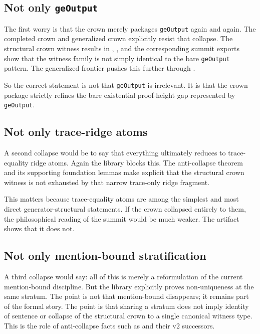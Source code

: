 \documentclass[11pt,a4paper]{article}
\theoremstyle{definition}
\begin{document}
\subsection{Not only \texttt{geOutput}}

The first worry is that the crown merely packages \texttt{geOutput} again and again. The completed crown and generalized crown explicitly resist that collapse. The structural crown witness results in , , and the corresponding summit exports show that the witness family is not simply identical to the bare \texttt{geOutput} pattern. The generalized frontier pushes this further through .

So the correct statement is not that \texttt{geOutput} is irrelevant. It is that the crown package strictly refines the bare existential proof-height gap represented by \texttt{geOutput}.

\subsection{Not only trace-ridge atoms}

A second collapse would be to say that everything ultimately reduces to trace-equality ridge atoms. Again the library blocks this. The anti-collapse theorem  and its supporting foundation lemmas make explicit that the structural crown witness is not exhausted by that narrow trace-only ridge fragment.

This matters because trace-equality atoms are among the simplest and most direct generator-structural statements. If the crown collapsed entirely to them, the philosophical reading of the summit would be much weaker. The artifact shows that it does not.

\subsection{Not only mention-bound stratification}

A third collapse would say: all of this is merely a reformulation of the current mention-bound discipline. But the library explicitly proves non-uniqueness at the same stratum. The point is not that mention-bound disappears; it remains part of the formal story. The point is that sharing a stratum does not imply identity of sentence or collapse of the structural crown to a single canonical witness type. This is the role of anti-collapse facts such as  and their v2 successors.
\end{document}
